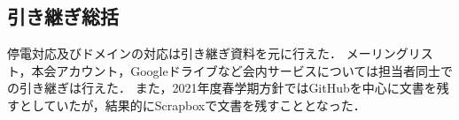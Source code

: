 \subsection*{引き継ぎ総括}


停電対応及びドメインの対応は引き継ぎ資料を元に行えた．
メーリングリスト，本会アカウント，Googleドライブなど会内サービスについては担当者同士での引き継ぎは行えた．
また，2021年度春学期方針ではGitHubを中心に文書を残すとしていたが，結果的にScrapboxで文書を残すこととなった．
